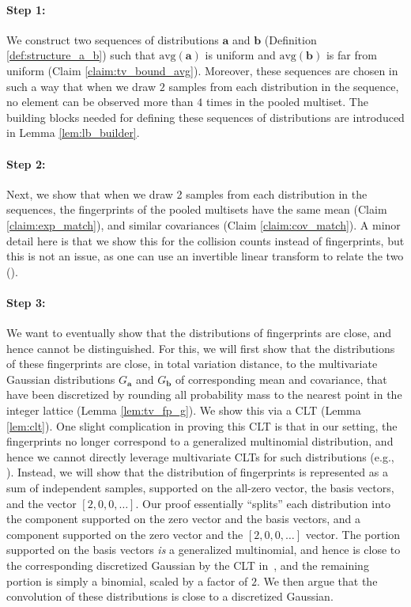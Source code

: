\documentclass[10pt]{article} %
\theoremstyle{plain}
\newcommand{\avg}{\mathrm{avg}}
\newcommand{\ba}{\textbf{a}}
\newcommand{\bb}{\textbf{b}}
\begin{document}
\paragraph{Step 1:} We construct two sequences of distributions $\ba$ and $\bb$ (Definition \ref{def:structure_a_b}) such that $\avg(\ba)$ is uniform and $\avg(\bb)$ is far from uniform (Claim \ref{claim:tv_bound_avg}). Moreover, these sequences are chosen in such a way that when we draw $2$ samples from each distribution in the sequence, no element can be observed  more than $4$ times in the pooled multiset. The building blocks needed for defining these sequences of distributions are introduced in Lemma \ref{lem:lb_builder}.

\paragraph{Step 2:} Next, we show that when we draw 2 samples from each distribution in the sequences, the fingerprints of the pooled multisets have the same mean (Claim \ref{claim:exp_match}), and similar covariances (Claim \ref{claim:cov_match}). A minor detail here is that we show this for the collision counts instead of fingerprints, but this is not an issue, as one can use an invertible linear transform to relate the two (). %

\paragraph{Step 3:} We want to eventually show that the distributions of fingerprints are close, and hence cannot be distinguished. For this, we will first show that the distributions of these fingerprints are close, in total variation distance, to the multivariate Gaussian distributions $G_\ba$ and $G_\bb$ of corresponding mean and covariance, that have been discretized by rounding all probability mass to the nearest point in the integer lattice (Lemma \ref{lem:tv_fp_g}). We show this via a CLT (Lemma \ref{lem:clt}). One slight complication in proving this CLT is that in our setting, the fingerprints no longer correspond to a generalized multinomial distribution, and hence we cannot directly leverage multivariate CLTs for such distributions (e.g., \cite{valiant2011estimating}).  Instead, we will show that the distribution of fingerprints is represented as a sum of independent samples, supported on the all-zero vector, the basis vectors, and the vector $[2,0,0,\ldots].$  Our proof essentially ``splits'' each distribution into the component supported on the zero vector and the basis vectors, and a component supported on the zero vector and the $[2,0,0,\ldots]$ vector. The portion supported on the basis vectors \emph{is} a generalized multinomial, and hence is close to the corresponding discretized Gaussian by the CLT in~\cite{valiant2011estimating}, and the remaining portion is simply a binomial, scaled by a factor of $2$.  We then argue that the convolution of these distributions is close to a discretized Gaussian.
\end{document}
